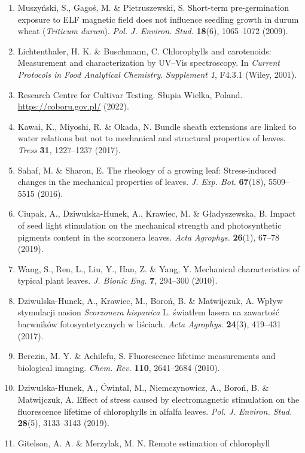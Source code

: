 \documentclass[
]{article}
\begin{document}
\begin{enumerate}
\item
  Muszyński, S., Gagoś, M. \& Pietruszewski, S. Short-term
  pre-germination exposure to ELF magnetic field does not influence
  seedling growth in durum wheat (\emph{Triticum durum}). \emph{Pol. J.
  Environ. Stud.} \textbf{18}(6), 1065--1072 (2009).
\item
  Lichtenthaler, H. K. \& Buschmann, C. Chlorophylls and carotenoids:
  Measurement and characterization by UV--Vis spectroscopy. In
  \emph{Current Protocols in Food Analytical Chemistry}.
  \emph{Supplement 1}, F4.3.1 (Wiley, 2001).
\item
  Research Centre for Cultivar Testing. Słupia Wielka, Poland.
  \url{https://coboru.gov.pl/} (2022).
\item
  Kawai, K., Miyoshi, R. \& Okada, N. Bundle sheath extensions are
  linked to water relations but not to mechanical and structural
  properties of leaves. \emph{Tress} \textbf{31}, 1227--1237 (2017).
\item
  Sahaf, M. \& Sharon, E. The rheology of a growing leaf: Stress-induced
  changes in the mechanical properties of leaves. \emph{J. Exp. Bot.}
  \textbf{67}(18), 5509--5515 (2016).
\item
  Ciupak, A., Dziwulska-Hunek, A., Krawiec, M. \& Gładyszewska, B.
  Impact of seed light stimulation on the mechanical strength and
  photosynthetic pigments content in the scorzonera leaves. \emph{Acta
  Agrophys.} \textbf{26}(1), 67--78 (2019).
\item
  Wang, S., Ren, L., Liu, Y., Han, Z. \& Yang, Y. Mechanical
  characteristics of typical plant leaves. \emph{J. Bionic Eng.}
  \textbf{7}, 294--300 (2010).
\item
  Dziwulska-Hunek, A., Krawiec, M., Boroń, B. \& Matwijczuk, A. Wpływ
  stymulacji nasion \emph{Scorzonera hispanica} L. światłem lasera na
  zawartość barwników fotosyntetycznych w liściach. \emph{Acta
  Agrophys.} \textbf{24}(3), 419--431 (2017).
\item
  Berezin, M. Y. \& Achilefu, S. Fluorescence lifetime measurements and
  biological imaging. \emph{Chem. Rev.} \textbf{110}, 2641--2684 (2010).
\item
  Dziwulska-Hunek, A., Ćwintal, M., Niemczynowicz, A., Boroń, B. \&
  Matwijczuk, A. Effect of stress caused by electromagnetic stimulation
  on the fluorescence lifetime of chlorophylls in alfalfa leaves.
  \emph{Pol. J. Environ. Stud.} \textbf{28}(5), 3133--3143 (2019).
\item
  Gitelson, A. A. \& Merzylak, M. N. Remote estimation of chlorophyll

\end{enumerate}
\end{document}
